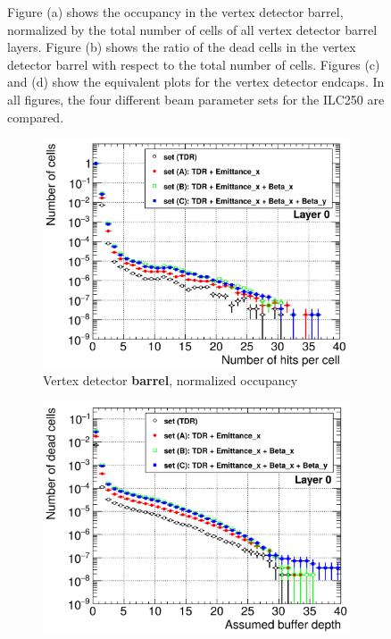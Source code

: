\begin{figure}
{   Figure (a) shows the occupancy in the vertex detector barrel, normalized by the total number of cells of all vertex detector barrel layers.
   Figure (b) shows the ratio of the dead cells in the vertex detector barrel with respect to the total number of cells.
   Figures (c) and (d) show the equivalent plots for the vertex detector endcaps.
   In all figures, the four different beam parameter sets for the ILC250 are compared.
   }
   \label{fig:PairBkg:ILC250_Occupancy}
 \end{figure}

  \begin{figure}
 \centering
  \begin{subfigure}[b]{0.49\textwidth}
   \centering
    \includegraphics[width=\textwidth]{Figures/Pairs/Occupancy_Comparison_Layer_0_numcells_ILC250_Comparison_ALL_SETS_5T_w_antiDiD_LEG.png}
   \caption{Vertex detector \textbf{barrel}, normalized occupancy}
   \end{subfigure}
   \hfill
    \begin{subfigure}[b]{0.49\textwidth}
   \centering
    \includegraphics[width=\textwidth]{Figures/Pairs/Occupancy_Comparison_Layer_0_deadcells_ILC250_Comparison_ALL_SETS_5T_w_antiDiD_LEG.png}

\end{subfigure}
\end{figure}
